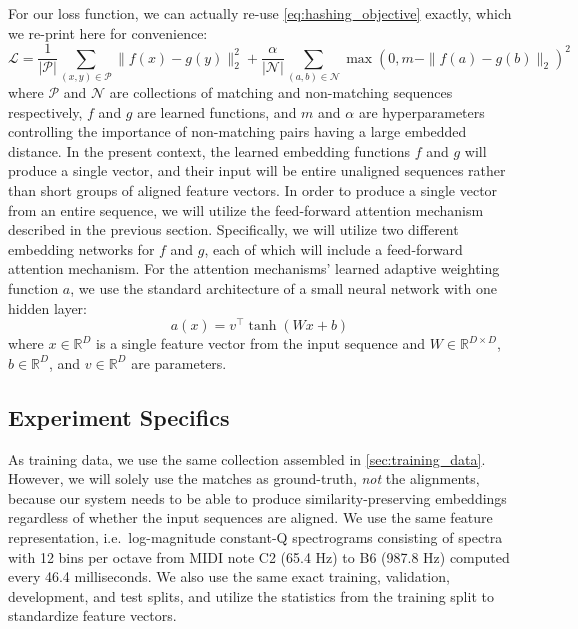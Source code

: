 For our loss function, we can actually re-use \cref{eq:hashing_objective} exactly, which we re-print here for convenience:
\begin{equation}
\mathcal{L} = \frac{1}{|\mathcal{P}|} \sum_{(x, y) \in \mathcal{P}} \| f(x) - g(y) \|_2^2  + \frac{\alpha}{|\mathcal{N}|} \sum_{(a, b) \in \mathcal{N}} \max(0, m - \|f(a) - g(b) \|_2)^2
\label{eq:embedding_objective}
\end{equation}
where $\mathcal{P}$ and $\mathcal{N}$ are collections of matching and non-matching sequences respectively, $f$ and $g$ are learned functions, and $m$ and $\alpha$ are hyperparameters controlling the importance of non-matching pairs having a large embedded distance.
In the present context, the learned embedding functions $f$ and $g$ will produce a single vector, and their input will be entire unaligned sequences rather than short groups of aligned feature vectors.
In order to produce a single vector from an entire sequence, we will utilize the feed-forward attention mechanism described in the previous section.
Specifically, we will utilize two different embedding networks for $f$ and $g$, each of which will include a feed-forward attention mechanism.
For the attention mechanisms' learned adaptive weighting function $a$, we use the standard architecture of a small neural network with one hidden layer:
\begin{equation}
a(x) = v^\top\tanh(Wx + b)
\label{eq:weighting_function}
\end{equation}
where $x \in \mathbb{R}^D$ is a single feature vector from the input sequence and $W \in \mathbb{R}^{D \times D}$, $b \in \mathbb{R}^D$, and $v \in \mathbb{R}^D$ are parameters.

\subsection{Experiment Specifics}
\label{sec:pse_specifics}

As training data, we use the same collection assembled in \cref{sec:training_data}.
However, we will solely use the matches as ground-truth, {\em not} the alignments, because our system needs to be able to produce similarity-preserving embeddings regardless of whether the input sequences are aligned.
We use the same feature representation, i.e.\ log-magnitude constant-Q spectrograms consisting of spectra with 12 bins per octave from MIDI note C2 (65.4 Hz) to B6 (987.8 Hz) computed every 46.4 milliseconds.
We also use the same exact training, validation, development, and test splits, and utilize the statistics from the training split to standardize feature vectors.

